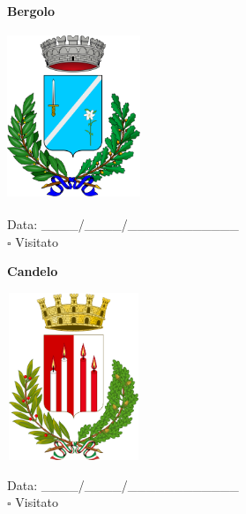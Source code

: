 \documentclass[a5paper,12pt]{article}
\begin{document}
\vspace{0.7cm}

\noindent
\begin{minipage}[t]{0.45\textwidth}
    \begin{center}
        \textbf{Bergolo}
    \end{center}
    \vspace{-0.5cm} %
    \begin{center}
        \includegraphics[height= 5cm, width=4cm]{Piemonte/Stemma Bergolo.png}
    \end{center}
    \vspace{-0.4cm} %
    \begin{flushleft}
        Data: \_\_\_\_/\_\_\_\_/\_\_\_\_\_\_\_\_\_\_\_\_ \\
        $\square$ Visitato
    \end{flushleft}
\end{minipage}
\hfill
\noindent
\begin{minipage}[t]{0.45\textwidth}
    \begin{center}
        \textbf{Candelo}
    \end{center}
    \vspace{-0.5cm} %
    \begin{center}
        \includegraphics[height= 5cm, width=4cm]{Piemonte/Stemma Candelo.png}
    \end{center}
    \vspace{-0.4cm} %
    \begin{flushleft}
        Data: \_\_\_\_/\_\_\_\_/\_\_\_\_\_\_\_\_\_\_\_\_ \\
        $\square$ Visitato
    \end{flushleft}
\end{minipage}
\end{document}
